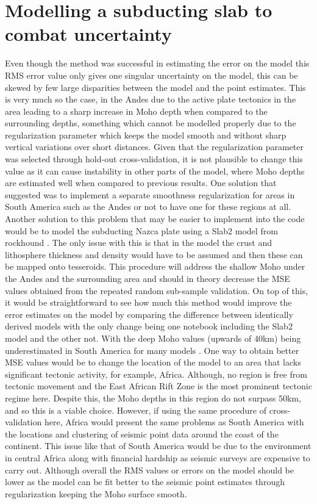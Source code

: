 \section{Modelling a subducting slab to combat uncertainty}
Even though the method was successful in estimating the error on the model this RMS error value only gives one singular uncertainty on the model, this can be skewed by few large disparities between the model and the point estimates. This is very much so the case, in the Andes due to the active plate tectonics in the area leading to a sharp increase in Moho depth when compared to the surrounding depths, something which cannot be modelled properly due to the regularization parameter which keeps the model smooth and without sharp vertical variations over short distances. Given that the regularization parameter was selected through hold-out cross-validation, it is not plausible to change this value as it can cause instability in other parts of the model, where Moho depths are estimated well when compared to previous results. One solution that \cite{Uieda2016} suggested was to implement a separate smoothness regularization for areas in South America such as the Andes or not to have one for these regions at all. Another solution to this problem that may be easier to implement into the code would be to model the subducting Nazca plate using a Slab2 model from rockhound \citep{uieda_leonardo_2020_3627166}. The only issue with this is that in the model the crust and lithosphere thickness and density would have to be assumed and then these can be mapped onto tesseroids. This procedure will address the shallow Moho under the Andes and the surrounding area and should in theory decrease the MSE values obtained from the repeated random sub-sample validation. On top of this, it would be straightforward to see how much this method would improve the error estimates on the model by comparing the difference between identically derived models with the only change being one notebook including the Slab2 model and the other not. With the deep Moho values (upwards of 40km) being underestimated in South America for many models \citep{vanderMeijde2013} \citep{Reguzzoni2015}. One way to obtain better MSE values would be to change the location of the model to an area that lacks significant tectonic activity, for example, Africa. Although, no region is free from tectonic movement and the East African Rift Zone is the most prominent tectonic regime here. Despite this, the Moho depths in this region do not surpass 50km, and so this is a viable choice. However, if using the same procedure of cross-validation here, Africa would present the same problems as South America with the locations and clustering of seismic point data around the coast of the continent. This issue like that of South America would be due to the environment in central Africa along with financial hardship as seismic surveys are expensive to carry out. Although overall the RMS values or errors on the model should be lower as the model can be fit better to the seismic point estimates through regularization keeping the Moho surface smooth.
